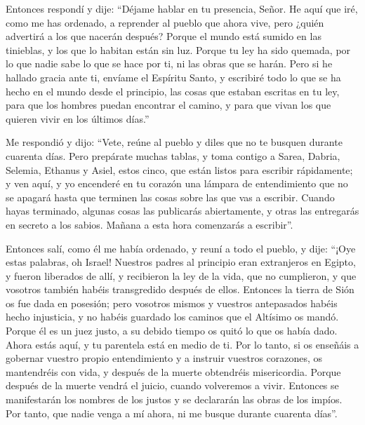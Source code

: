  Entonces respondí y dije: ``Déjame hablar en tu
presencia, Señor.  He aquí que iré, como me has ordenado,
a reprender al pueblo que ahora vive, pero ¿quién advertirá a los que
nacerán después? Porque el mundo está sumido en las tinieblas, y los que
lo habitan están sin luz.  Porque tu ley ha sido quemada,
por lo que nadie sabe lo que se hace por ti, ni las obras que se harán.
 Pero si he hallado gracia ante ti, envíame el Espíritu
Santo, y escribiré todo lo que se ha hecho en el mundo desde el
principio, las cosas que estaban escritas en tu ley, para que los
hombres puedan encontrar el camino, y para que vivan los que quieren
vivir en los últimos días.''

 Me respondió y dijo: ``Vete, reúne al pueblo y diles que
no te busquen durante cuarenta días.  Pero prepárate
muchas tablas, y toma contigo a Sarea, Dabria, Selemia, Ethanus y Asiel,
estos cinco, que están listos para escribir rápidamente; 
y ven aquí, y yo encenderé en tu corazón una lámpara de entendimiento
que no se apagará hasta que terminen las cosas sobre las que vas a
escribir.  Cuando hayas terminado, algunas cosas las
publicarás abiertamente, y otras las entregarás en secreto a los sabios.
Mañana a esta hora comenzarás a escribir''.

 Entonces salí, como él me había ordenado, y reuní a todo
el pueblo, y dije:  ``¡Oye estas palabras, oh Israel!
 Nuestros padres al principio eran extranjeros en Egipto,
y fueron liberados de allí,  y recibieron la ley de la
vida, que no cumplieron, y que vosotros también habéis transgredido
después de ellos.  Entonces la tierra de Sión os fue dada
en posesión; pero vosotros mismos y vuestros antepasados habéis hecho
injusticia, y no habéis guardado los caminos que el Altísimo os mandó.
 Porque él es un juez justo, a su debido tiempo os quitó
lo que os había dado.  Ahora estás aquí, y tu parentela
está en medio de ti.  Por lo tanto, si os enseñáis a
gobernar vuestro propio entendimiento y a instruir vuestros corazones,
os mantendréis con vida, y después de la muerte obtendréis misericordia.
 Porque después de la muerte vendrá el juicio, cuando
volveremos a vivir. Entonces se manifestarán los nombres de los justos y
se declararán las obras de los impíos.  Por tanto, que
nadie venga a mí ahora, ni me busque durante cuarenta días''.

